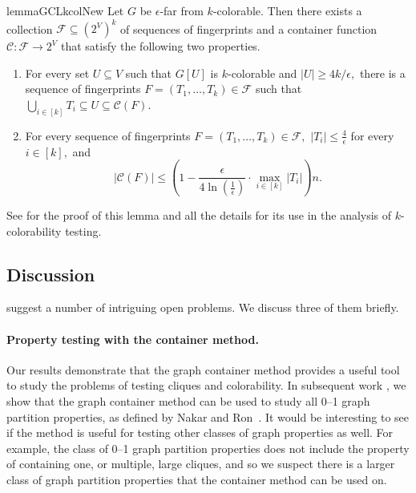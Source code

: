 \documentclass[11pt]{article}
\begin{document}
\begin{restatable}{lemma}{GCLkcolNew}
    \label{lem:GCL-kcolNew}
    Let $G$ be $\epsilon$-far from $k$-colorable.
    Then there exists a collection $\mathcal{F} \subseteq (2^V)^k$ of sequences of fingerprints and a container function $\mathcal{C} : \mathcal{F} \rightarrow 2^V$ that satisfy the following two properties.
    \begin{enumerate}
        \item For every set $U \subseteq V$ such that $G[U]$ is $k$-colorable and $|U| \geq 4k/\epsilon,$ there is a sequence of fingerprints $F=(T_1,\dots,T_k) \in \mathcal{F}$ such that $\bigcup_{i \in [k]} T_i \subseteq U \subseteq \mathcal{C}(F).$
        \item For every sequence of fingerprints $F=(T_1,\dots,T_k) \in \mathcal{F},$ $|T_i| \leq \frac{4}{\epsilon}$ for every $i \in [k],$ and \[|\mathcal{C}(F)| \leq \left( 1 - \frac{\epsilon}{4\ln (\frac 1\epsilon)}\cdot \max_{i \in [k]} |T_i| \right)n.\]
    \end{enumerate}
\end{restatable}

See  for the proof of this lemma and all the details for its use in the analysis of $k$-colorability testing.

\subsection{Discussion}

 suggest a number of intriguing open problems. We discuss three of them briefly.

\paragraph{Property testing with the container method.}
Our results demonstrate that the graph container method provides a useful tool to study the problems of testing cliques and colorability.
In subsequent work \cite{blais2024new}, we show that the graph container method can be used to study all 0--1 graph partition properties, as defined by Nakar and Ron~\cite{NakarRon2018}.
It would be interesting to see if the method is useful for testing other classes of graph properties as well.
For example, the class of 0--1 graph partition properties does not include the property of containing one, or multiple, large cliques, and so we suspect there is a larger class of graph partition properties that the container method can be used on.
\end{document}
